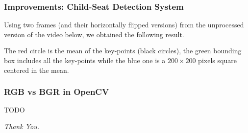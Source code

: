 \documentclass{beamer}
\begin{document}
	\begin{frame}
		\frametitle{Improvements: Child-Seat Detection System}
		Using two frames (and their horizontally flipped versions) from the unprocessed version of the video below, we obtained the following result.
		
		\bigskip
		
		
		The red circle is the mean of the key-points (black circles), the green bounding box includes all the key-points while the blue one is a $200 \times 200$ pixels square centered in the mean.
	\end{frame}

	\begin{frame}
		\frametitle{RGB vs BGR in OpenCV}
		TODO
	\end{frame}
	
	\begin{frame}
		\centering \Huge
		\emph{Thank You.}
	\end{frame}
\end{document}
